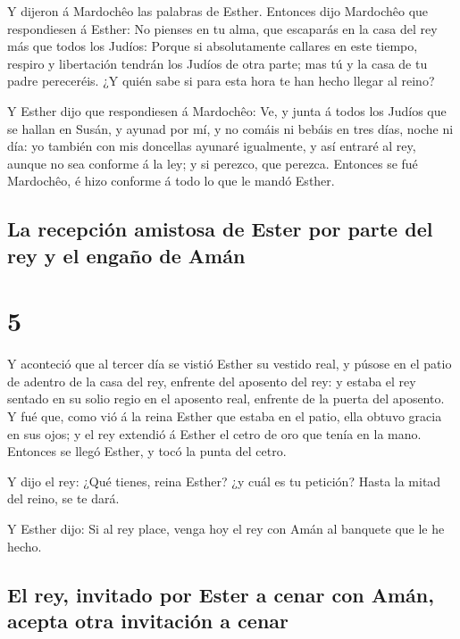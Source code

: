  Y dijeron á Mardochêo las palabras de Esther.
 Entonces dijo Mardochêo que respondiesen á Esther: No
pienses en tu alma, que escaparás en la casa del rey más que todos los
Judíos:  Porque si absolutamente callares en este tiempo,
respiro y libertación tendrán los Judíos de otra parte; mas tú y la casa
de tu padre pereceréis. ¿Y quién sabe si para esta hora te han hecho
llegar al reino?

 Y Esther dijo que respondiesen á Mardochêo:
 Ve, y junta á todos los Judíos que se hallan en Susán, y
ayunad por mí, y no comáis ni bebáis en tres días, noche ni día: yo
también con mis doncellas ayunaré igualmente, y así entraré al rey,
aunque no sea conforme á la ley; y si perezco, que perezca.
 Entonces se fué Mardochêo, é hizo conforme á todo lo que
le mandó Esther.

\hypertarget{la-recepciuxf3n-amistosa-de-ester-por-parte-del-rey-y-el-engauxf1o-de-amuxe1n}{%
\subsection{La recepción amistosa de Ester por parte del rey y el engaño
de
Amán}\label{la-recepciuxf3n-amistosa-de-ester-por-parte-del-rey-y-el-engauxf1o-de-amuxe1n}}

\hypertarget{section-4}{%
\section{5}\label{section-4}}

 Y aconteció que al tercer día se vistió Esther su vestido
real, y púsose en el patio de adentro de la casa del rey, enfrente del
aposento del rey: y estaba el rey sentado en su solio regio en el
aposento real, enfrente de la puerta del aposento.  Y fué
que, como vió á la reina Esther que estaba en el patio, ella obtuvo
gracia en sus ojos; y el rey extendió á Esther el cetro de oro que tenía
en la mano. Entonces se llegó Esther, y tocó la punta del cetro.

 Y dijo el rey: ¿Qué tienes, reina Esther? ¿y cuál es tu
petición? Hasta la mitad del reino, se te dará.

 Y Esther dijo: Si al rey place, venga hoy el rey con Amán
al banquete que le he hecho.

\hypertarget{el-rey-invitado-por-ester-a-cenar-con-amuxe1n-acepta-otra-invitaciuxf3n-a-cenar}{%
\subsection{El rey, invitado por Ester a cenar con Amán, acepta otra
invitación a
cenar}\label{el-rey-invitado-por-ester-a-cenar-con-amuxe1n-acepta-otra-invitaciuxf3n-a-cenar}}

